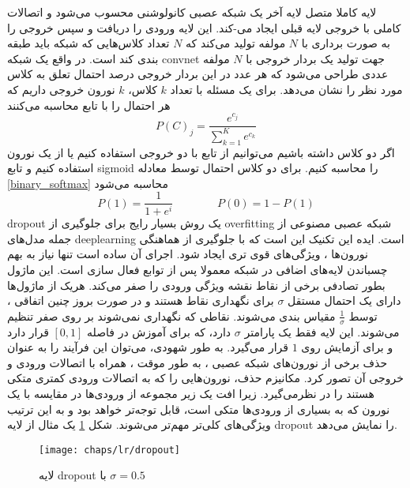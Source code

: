 لایه کاملا متصل لایه آخر یک شبکه عصبی کانولوشنی محسوب می‌شود و اتصالات کاملی با خروجی لایه قبلی ایجاد می-کند. این لایه ورودی را دریافت و سپس خروجی را به صورت برداری با $N$ مولفه تولید می‌کند که $N$ تعداد کلاس‌هایی که شبکه باید طبقه بندی کند است. در واقع یک شبکه  \gls{convnet} جهت تولید یک بردار خروجی با $N$ مولفه عددی طراحی می‌شود که هر عدد در این بردار خروجی درصد احتمال تعلق به کلاس مورد نظر را نشان می‌دهد. برای یک مسئله با تعداد $k$  کلاس، $k$ نورون خروجی داریم که هر احتمال را با تابع  محاسبه می‌کنند
\begin{equation}
	P(C)_j = \frac{e^{c_j}}{\sum^{K}_{k=1}e^{c_k}}
	\label{eq:ch_lr:softmax}
\end{equation}
اگر دو کلاس داشته باشیم می‌توانیم از تابع  با دو خروجی استفاده کنیم یا از یک نورون استفاده کنیم و تابع \gls{sigmoid} را محاسبه کنیم. برای دو کلاس احتمال توسط معادله \ref{binary_softmax} محاسبه می‌شود
\begin{equation}
	P(1) = \frac{1}{1+e^i} \qquad \qquad P(0) = 1-P(1)
	\label{eq:ch_lr:binary_softmax}
\end{equation}
\gls{dropout} یک روش بسیار رایج برای جلوگیری از \gls{overfitting} شبکه عصبی مصنوعی از جمله مدل‌های \gls{deeplearning} است\cite{srivastava2014dropout}.
ایده این تکنیک این است که با جلوگیری از هماهنگی نورون‌ها ، ویژگی‌های قوی تری ایجاد شود. اجرای آن ساده است تنها نیاز به بهم چسباندن لایه‌های اضافی در شبکه معمولا پس از توابع فعال سازی است. این ماژول بطور تصادفی برخی از نقاط نقشه ویژگی ورودی را  صفر می‌کند. هریک از ماژول‌ها دارای یک احتمال مستقل $\sigma$ برای نگهداری نقاط هستند و در صورت بروز چنین اتفاقی ، توسط  $\frac{1}{\sigma}$ مقیاس بندی می‌شوند. نقاطی که نگهداری نمی‌شوند بر روی صفر تنظیم می‌شوند. این لایه فقط یک پارامتر $\sigma$ دارد، که برای آموزش در فاصله $[0,1]$ قرار دارد و برای آزمایش روی $1$ قرار می‌گیرد. به طور شهودی، می‌توان این فرآیند را به عنوان حذف برخی از نورون‌های شبکه عصبی ، به طور موقت ، همراه با اتصالات ورودی و خروجی آن تصور کرد. مکانیزم حذف، نورون‌هایی را که به اتصالات ورودی کمتری متکی هستند را در نظرمی‌گیرد. زیرا افت یک زیر مجموعه از ورودی‌ها در مقایسه با یک نورون که به بسیاری از ورودی‌ها متکی است، قابل توجه‌تر خواهد بود و به این ترتیب ویژگی‌های کلی‌تر مهم‌تر می‌شوند. شکل \ref{fig:ch_lr:dropout} یک مثال از لایه \gls{dropout} را نمایش می‌دهد.
\begin{figure}[!ht]
	\centerline{\texttt{[image: chaps/lr/dropout]}}
	\caption{
		لایه \gls{dropout} با $\sigma=0.5$
	}
	\label{fig:ch_lr:dropout}
\end{figure}
